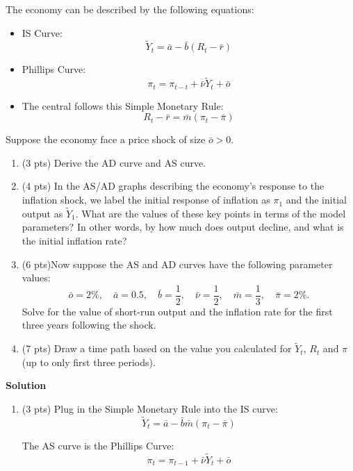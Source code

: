 \documentclass[addpoints,12pt,answers]{exam}
\begin{document}
\begin{questions}
		\clearpage
		
	
		
		
		\clearpage
		\question  [20]  The economy can be described by the following equations:
		\begin{itemize}
			\item IS Curve: 
			\[
			\tilde{Y}_t = \bar{a} - \bar{b}(R_t-\bar{r})
			\]
			\item Phillips Curve: 
			\[
			\pi_{t} = \pi_{t-t} + \bar{\nu}\tilde{Y}_t + \bar{o}
			\]
			\item The central follows this Simple Monetary Rule:
			\[
			R_t - \bar{r} = \bar{m} \left(\pi_t - \bar{\pi}\right)
			\]
		\end{itemize}	
			
		Suppose the economy face a price shock of size \(\bar{o} >0\).
		
		\begin{enumerate}[label=(\alph*)]
			\item (3 pts) Derive the AD curve and AS curve.
			\item (4 pts) In the AS/AD graphs describing the economy's response to the inflation shock, we label the initial response of inflation as \(\pi_1\) and the initial output as \(\tilde{Y}_1\). What are the values of these key points in terms of the model parameters? In other words, by how much does output decline, and what is the initial inflation rate?
			
			\item (6 pts)Now suppose the AS and AD curves have the following parameter values:
			\[
			\bar{o} = 2\%, \quad
			\bar{a} = 0.5, \quad
			\bar{b} = \frac{1}{2}, \quad
			\bar{\nu} = \frac{1}{2}, \quad
			\bar{m} = \frac{1}{3}, \quad
			\bar{\pi} = 2\%.
			\]
			Solve for the value of short-run output and the inflation rate for the first three years following the shock.
			
			\item (7 pts) Draw a time path based on the value you calculated for $\tilde{Y}_t$, $R_t$ and $\pi$ (up to only first three periods). 
		\end{enumerate}
%		
		\clearpage
		\textbf{Solution}
		\begin{enumerate}[label=(\alph*)]
			\item (3 pts) 
			Plug in the Simple Monetary Rule into the IS curve:
			\[
			\tilde{Y}_t = \bar{a} - \bar{b}\bar{m} \left(\pi_t - \bar{\pi}\right)
			\]
			
			The AS curve is the Phillips Curve: 
			\[
			\pi_{t} = \pi_{t-1} + \bar{\nu}\tilde{Y}_t + \bar{o}
			\]
			

\end{enumerate}
\end{questions}
\end{document}
